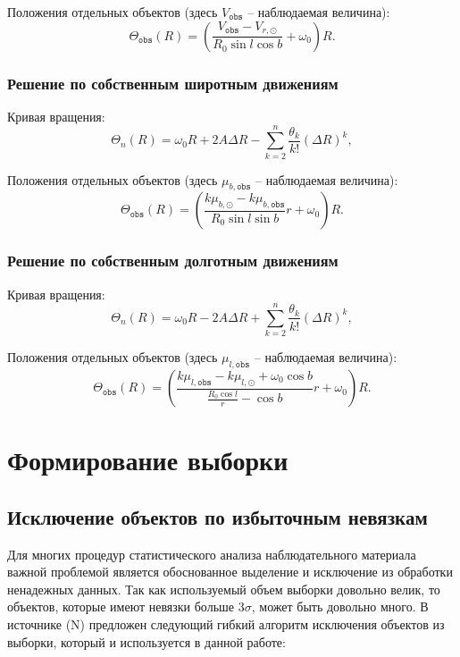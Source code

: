 \documentclass{matmex-diploma-custom}
\begin{document}
Положения отдельных объектов (здесь $V_{\texttt{obs}}$ -- наблюдаемая величина):
\begin{equation}
        \Theta_{\texttt{obs}}(R) = \left( \frac{V_{\texttt{obs}} - V_{r, \odot}}{R_0 \sin{l} \cos{b}} + \omega_0 \right) R.
\end{equation}
\subsubsection{Решение по собственным широтным движениям}
Кривая вращения:
\begin{equation}
        \Theta_n(R) = \omega_0 R + 2A\Delta R - \sum^n_{k = 2} \frac{\theta_k}{k!} \left( \Delta R \right)^k ,
\end{equation}

Положения отдельных объектов (здесь $\mu_{b, \texttt{obs}}$ -- наблюдаемая величина):
\begin{equation}
        \Theta_{\texttt{obs}}(R) = \left( \frac{k\mu_{b, \odot} - k\mu_{b, \texttt{obs}}}{R_0 \sin{l} \sin{b}} r + \omega_0 \right) R.
\end{equation}
\subsubsection{Решение по собственным долготным движениям}
Кривая вращения:
\begin{equation}
        \Theta_n(R) = \omega_0 R - 2A\Delta R + \sum^n_{k = 2} \frac{\theta_k}{k!} \left( \Delta R \right)^k ,
\end{equation}

Положения отдельных объектов (здесь $\mu_{l, \texttt{obs}}$ -- наблюдаемая величина):
\begin{equation}
        \Theta_{\texttt{obs}}(R) = \left( \frac{k\mu_{l, \texttt{obs}} - k\mu_{l, \odot} + \omega_0 \cos{b}}{\frac{R_0 \cos{l}}{r} - \cos{b}} r + \omega_0 \right) R.
\end{equation}




\section{Формирование выборки}
\subsection{Исключение объектов по избыточным невязкам} \label{err_filter}
Для многих процедур статистического анализа наблюдательного материала важной проблемой является обоснованное выделение и исключение из обработки ненадежных данных. Так как используемый объем выборки довольно велик, то объектов, которые имеют невязки больше $3\sigma$, может быть довольно много. В источнике (N) предложен следующий гибкий алгоритм исключения объектов из выборки, который и используется в данной работе:
\end{document}
